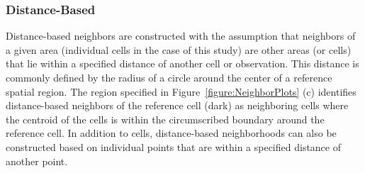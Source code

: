 \documentclass{article}[11pt]
\begin{document}



\subsubsection{Distance-Based}

Distance-based neighbors\cite{fotheringham_sage_2009} are constructed with the assumption that neighbors of a given area (individual cells in the case of this study) are other areas (or cells) that lie within a specified distance of another cell or observation. This distance is commonly defined by the radius of a circle around the center of a reference spatial region. The region specified in Figure~\ref{figure:NeighborPlots} (c) identifies distance-based neighbors of the reference cell (dark) as neighboring cells where the centroid of the cells is within the circumscribed boundary around the reference cell. In addition to cells, distance-based neighborhoods can also be constructed based on individual points that are within a specified distance of another point.

\end{document}
